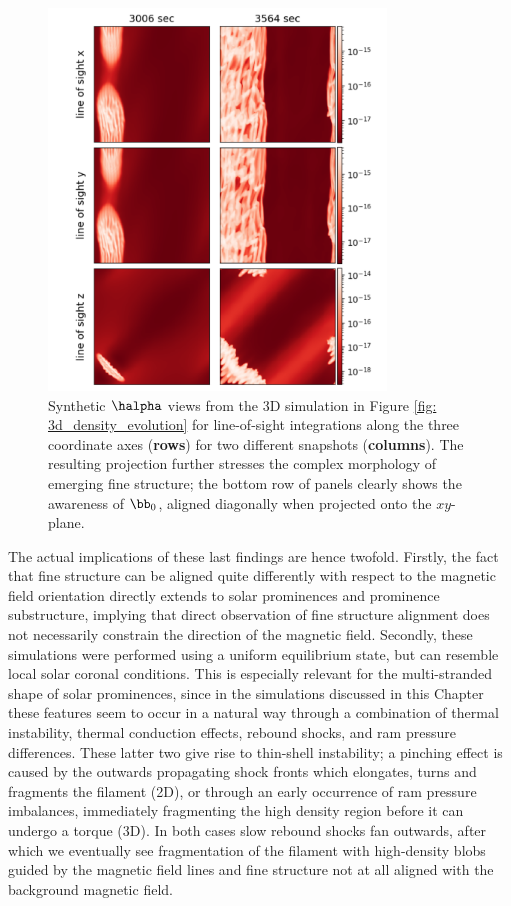 \begin{figure}[t]
  \centering
  \includegraphics[width=0.8\textwidth]{3d_synthetic_views.png}
  \caption{
    Synthetic $\halpha$ views from the 3D simulation in Figure \ref{fig: 3d_density_evolution} for line-of-sight integrations along the three coordinate axes (\textbf{rows}) for two different snapshots (\textbf{columns}). The resulting projection further stresses the complex morphology of emerging fine structure; the bottom row of panels clearly shows the awareness of $\bb_0$, aligned diagonally when projected onto the $xy$-plane.
  }
  \label{fig: 3d_synthetic_views}
\end{figure}

The actual implications of these last findings are hence twofold. Firstly, the fact that fine structure can be aligned quite differently with respect to the magnetic field orientation directly extends to solar prominences and prominence substructure, implying that direct observation of fine structure alignment does not necessarily constrain the direction of the magnetic field. Secondly, these simulations were performed using a uniform equilibrium state, but can resemble local solar coronal conditions. This is especially relevant for the multi-stranded shape of solar prominences, since in the simulations discussed in this Chapter these features seem to occur in a natural way through a combination of thermal instability, thermal conduction effects, rebound shocks, and ram pressure differences. These latter two give rise to thin-shell instability; a pinching effect is caused by the outwards propagating shock fronts which elongates, turns and fragments the filament (2D), or through an early occurrence of ram pressure imbalances, immediately fragmenting the high density region before it can undergo a torque (3D). In both cases slow rebound shocks fan outwards, after which we eventually see fragmentation of the filament with high-density blobs guided by the magnetic field lines and fine structure not at all aligned with the background magnetic field.


